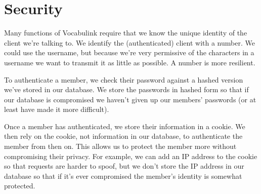 \chapter{Security}

Many functions of Vocabulink require that we know the unique identity of the
client we're talking to. We identify the (authenticated) client with a number.
We could use the username, but because we're very permissive of the characters
in a username we want to transmit it as little as possible. A number is more
resilient.

To authenticate a member, we check their password against a hashed version
we've stored in our database. We store the passwords in hashed form so that if
our database is compromised we haven't given up our members' passwords (or at
least have made it more difficult).

Once a member has authenticated, we store their information in a cookie. We
then rely on the cookie, not information in our database, to authenticate the
member from then on. This allows us to protect the member more without
compromising their privacy. For example, we can add an IP address to the cookie
so that requests are harder to spoof, but we don't store the IP address in our
database so that if it's ever compromised the member's identity is somewhat
protected.
